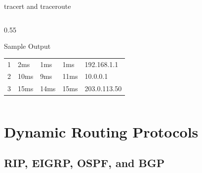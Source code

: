 \documentclass[aspectratio=169]{beamer}  %
\begin{document}
\begin{frame}{tracert and traceroute}
\begin{columns}[T]
\begin{column}{0.55\textwidth}
            \vspace{0.3em}
            \begin{block}{Sample Output}
                \ttfamily\small
                \begin{tabular}{r l l l l}
                    1 & 2ms & 1ms & 1ms & 192.168.1.1 \\
                    2 & 10ms & 9ms & 11ms & 10.0.0.1 \\
                    3 & 15ms & 14ms & 15ms & 203.0.113.50 \\
                \end{tabular}
            \end{block}
        \end{column}
    \end{columns}
\end{frame}

\section{Dynamic Routing Protocols}
\subsection{RIP, EIGRP, OSPF, and BGP}

\end{document}
